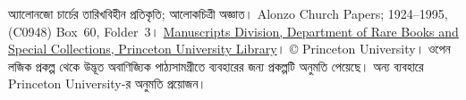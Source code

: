 অ্যালোনজো চার্চের তারিখবিহীন প্রতিকৃতি; আলোকচিত্রী অজ্ঞাত।
Alonzo Church Papers; 1924--1995, (C0948) Box~60, Folder~3।
\href{http://rbsc.princeton.edu/divisions/manuscripts-division}{Manuscripts
Division, Department of Rare Books and Special Collections, Princeton
University Library}। \copyright{} Princeton University। ওপেন লজিক
প্রকল্প থেকে উদ্ভূত অবাণিজ্যিক পাঠ্যসামগ্রীতে ব্যবহারের জন্য প্রকল্পটি
অনুমতি পেয়েছে। অন্য ব্যবহারে Princeton University-র অনুমতি প্রয়োজন।

